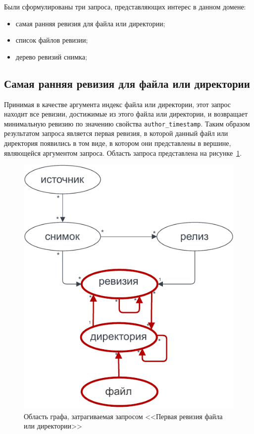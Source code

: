 \documentclass[times,specification,annotation]{itmo-student-thesis}
\begin{document}
Были сформулированы три запроса, представляющих интерес в данном домене:

\begin{itemize}
    \item самая ранняя ревизия для файла или директории;
    \item список файлов ревизии;
    \item дерево ревизий снимка;
\end{itemize}

\subsection{Самая ранняя ревизия для файла или директории}

Принимая в качестве аргумента индекс файла или директории, этот запрос находит все ревизии, достижимые из этого файла или директории, и возвращает минимальную ревизию по значению свойства \texttt{author\_timestamp}. Таким образом результатом запроса является первая ревизия, в которой данный файл или директория появились в том виде, в котором они представлены в вершине, являющейся аргументом запроса. Область запроса представлена на рисунке~\ref{ecr-graph}.

\begin{figure}[!h]
\caption{Область графа, затрагиваемая запросом <<Первая ревизия файла или директории>>}\label{ecr-graph}
\centering
\includegraphics{img/ecr-graph.pdf}
\end{figure}
\end{document}
